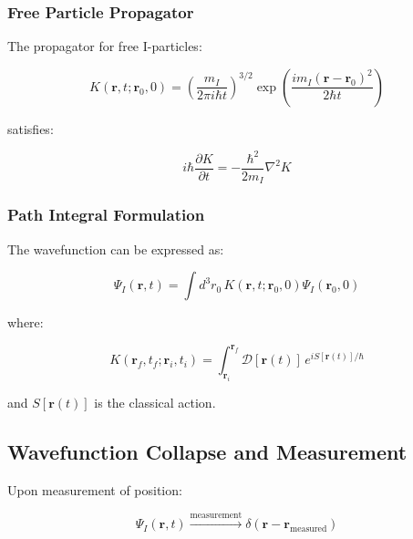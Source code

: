 \subsubsection{Free Particle Propagator}

The propagator for free I-particles:

\begin{equation}
\label{eq:free_propagator}
K(\mathbf{r}, t; \mathbf{r}_0, 0) = \left(\frac{m_I}{2\pi i\hbar t}\right)^{3/2} \exp\left(\frac{im_I(\mathbf{r}-\mathbf{r}_0)^2}{2\hbar t}\right)
\end{equation}

satisfies:

\begin{equation}
\label{eq:propagator_equation}
i\hbar\frac{\partial K}{\partial t} = -\frac{\hbar^2}{2m_I}\nabla^2 K
\end{equation}

\subsubsection{Path Integral Formulation}

The wavefunction can be expressed as:

\begin{equation}
\label{eq:path_integral}
\Psi_I(\mathbf{r}, t) = \int d^3r_0 \, K(\mathbf{r}, t; \mathbf{r}_0, 0) \Psi_I(\mathbf{r}_0, 0)
\end{equation}

where:

\begin{equation}
\label{eq:feynman_path_integral}
K(\mathbf{r}_f, t_f; \mathbf{r}_i, t_i) = \int_{\mathbf{r}_i}^{\mathbf{r}_f} \mathcal{D}[\mathbf{r}(t)] \, e^{iS[\mathbf{r}(t)]/\hbar}
\end{equation}

and $S[\mathbf{r}(t)]$ is the classical action.

\subsection{Wavefunction Collapse and Measurement}

Upon measurement of position:

\begin{equation}
\label{eq:position_measurement}
\Psi_I(\mathbf{r}, t) \xrightarrow{\text{measurement}} \delta(\mathbf{r} - \mathbf{r}_{\text{measured}})
\end{equation}

